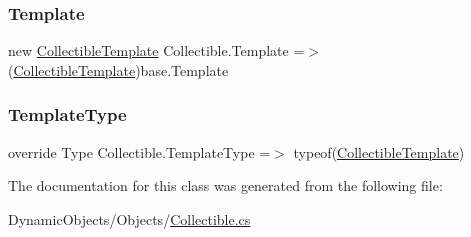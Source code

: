 \subsubsection{\texorpdfstring{Template}{Template}}
{\footnotesize\ttfamily new \mbox{\hyperlink{class_collectible_template}{Collectible\+Template}} Collectible.\+Template =$>$ (\mbox{\hyperlink{class_collectible_template}{Collectible\+Template}})base.\+Template}

\mbox{\label{class_collectible_a1060dabdae062fea8758da67704429b7}} 
\subsubsection{\texorpdfstring{Template\+Type}{TemplateType}}
{\footnotesize\ttfamily override Type Collectible.\+Template\+Type =$>$ typeof(\mbox{\hyperlink{class_collectible_template}{Collectible\+Template}})\hspace{0.3cm}{\ttfamily [protected]}}



The documentation for this class was generated from the following file\+:\begin{DoxyCompactItemize}
\item 
Dynamic\+Objects/\+Objects/\mbox{\hyperlink{_collectible_8cs}{Collectible.\+cs}}\end{DoxyCompactItemize}
